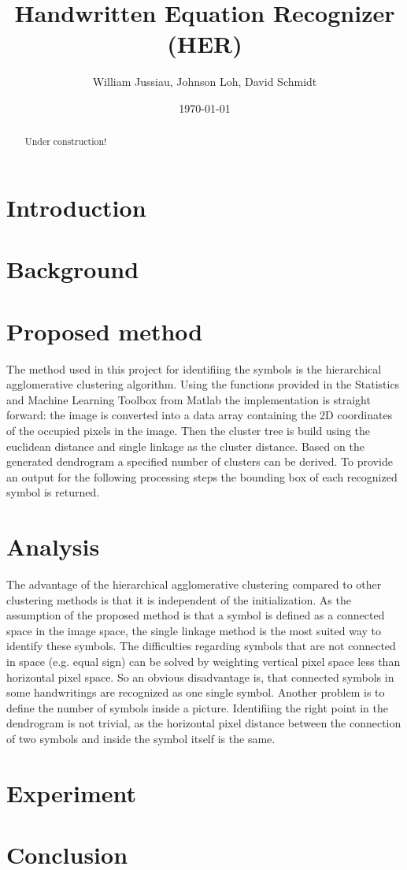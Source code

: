 \documentclass[twocolumn, twoside]{article}%
\title{Handwritten Equation Recognizer (HER)}
\author{William Jussiau, Johnson Loh, David Schmidt}
\date{\today}
\begin{document}
\begin{strip}
  \vspace*{\dimexpr-\baselineskip-\stripsep\relax}
  \centering
  \maketitle
  \vskip\baselineskip
  \vskip\baselineskip
\end{strip}


    \begin{abstract}
	    Under construction!
	\end{abstract}
	
	\section{Introduction}
	    
	\section{Background}
	    
	    
	\section{Proposed method}
		The method used in this project for identifiing the symbols is the hierarchical agglomerative clustering algorithm. Using the functions provided in the Statistics and Machine Learning Toolbox from Matlab the implementation is straight forward: the image is converted into a data array containing the 2D coordinates of the occupied pixels in the image. Then the cluster tree is build using the euclidean distance and single linkage as the cluster distance. Based on the generated dendrogram a specified number of clusters can be derived. To provide an output for the following processing steps the bounding box of each recognized symbol is returned.
	
	\section{Analysis}
		The advantage of the hierarchical agglomerative clustering compared to other clustering methods is that it is independent of the initialization. As the assumption of the proposed method is that a symbol is defined as a connected space in the image space, the single linkage method is the most suited way to identify these symbols. The difficulties regarding symbols that are not connected in space (e.g. equal sign) can be solved by weighting vertical pixel space less than horizontal pixel space. 
		So an obvious disadvantage is, that connected symbols in some handwritings are recognized as one single symbol. Another problem is to define the number of symbols inside a picture. Identifiing the right point in the dendrogram is not trivial, as the horizontal pixel distance between the connection of two symbols and inside the symbol itself is the same.
	
	\section{Experiment}
	
	\section{Conclusion}
\end{document}
